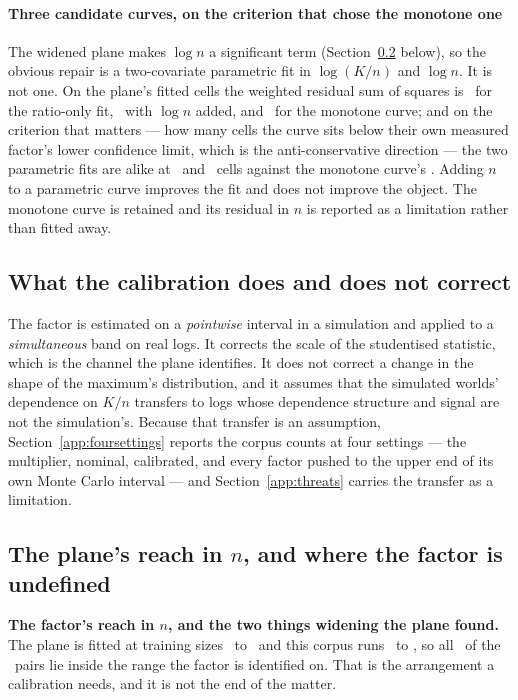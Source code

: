 \paragraph{Three candidate curves, on the criterion that chose the monotone
one} The widened plane makes $\log n$ a significant
term (Section~\ref{app:planereach} below), so the obvious repair is a two-covariate
parametric fit in $\log(K/n)$ and $\log n$. It is not one. On the plane's
fitted cells the weighted residual sum of squares is \wrssRatioOnly\ for the
ratio-only fit, \wrssWithN\ with $\log n$ added, and \wrssIsotonic\ for the
monotone curve; and on the criterion that matters --- how many cells the
curve sits below their own measured factor's lower confidence limit, which is
the anti-conservative direction --- the two parametric fits are alike at
\nUnderRatioOnly\ and \nUnderWithN\ cells against the monotone curve's
\nUnderIsotonic. Adding $n$ to a parametric curve improves the fit and does
not improve the object. The monotone curve is retained and its residual in
$n$ is reported as a limitation rather than fitted away.

\subsection{What the calibration does and does not correct}

The factor is estimated on a \emph{pointwise} interval in a simulation and
applied to a \emph{simultaneous} band on real logs. It corrects the scale of
the studentised statistic, which is the channel the plane identifies. It does
not correct a change in the shape of the maximum's distribution, and it
assumes that the simulated worlds' dependence on $K/n$ transfers to logs whose
dependence structure and signal are not the simulation's. Because that
transfer is an assumption, Section~\ref{app:foursettings} reports the corpus
counts at four settings --- the multiplier, nominal, calibrated, and every factor pushed to the
upper end of its own Monte Carlo interval --- and Section~\ref{app:threats}
carries the transfer as a limitation.

\subsection{The plane's reach in $n$, and where the factor is undefined}
\label{app:planereach}


\textbf{The factor's reach in $n$, and the two things widening the plane
found.} The plane is fitted at training sizes \planeNtrainLo\ to
\planeNtrainHi\ and this corpus runs \corpusNtrainLo\ to \corpusNtrainHi, so
all \nPairsInsidePlaneN\ of the \nPairs\ pairs lie inside the range the
factor is identified on. That is the arrangement a calibration needs, and it
is not the end of the matter.

